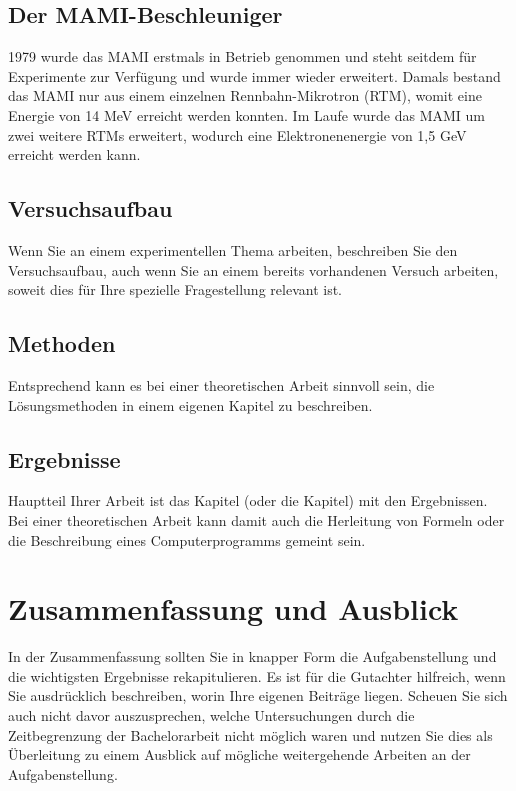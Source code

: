 \documentclass[a4paper,11pt,oneside,final,german,openbib,pdftex]{scrbook}
\begin{document}
\section{Der MAMI-Beschleuniger}
1979 wurde das MAMI erstmals in Betrieb genommen und steht seitdem für Experimente zur Verfügung und wurde immer wieder erweitert. Damals bestand das MAMI nur aus einem einzelnen Rennbahn-Mikrotron (RTM), womit eine Energie von 14 MeV erreicht werden konnten. Im Laufe wurde das MAMI um zwei weitere RTMs erweitert, wodurch eine Elektronenenergie von 1,5 GeV erreicht werden kann. \newline


\section{Versuchsaufbau}

Wenn Sie an einem experimentellen Thema arbeiten, beschreiben Sie 
den Versuchsaufbau, auch wenn Sie an einem bereits vorhandenen 
Versuch arbeiten, soweit dies f\"ur Ihre spezielle Fragestellung 
relevant ist. 

\section{Methoden}

Entsprechend kann es bei einer theoretischen Arbeit sinnvoll sein,
die L\"osungsmethoden in einem eigenen Kapitel zu beschreiben.

\section{Ergebnisse}

Hauptteil Ihrer Arbeit ist das Kapitel (oder die Kapitel) mit den 
Ergebnissen. Bei einer theoretischen Arbeit kann damit auch 
die Herleitung von Formeln oder die Beschreibung eines Computerprogramms 
gemeint sein.

\chapter{Zusammenfassung und Ausblick}

In der Zusammenfassung sollten Sie in knapper Form die Aufgabenstellung 
und die wichtigsten Ergebnisse rekapitulieren. Es ist f\"ur die 
Gutachter hilfreich, wenn Sie ausdr\"ucklich beschreiben, worin 
Ihre eigenen Beitr\"age liegen. Scheuen Sie sich auch nicht davor 
auszusprechen, welche Untersuchungen durch die Zeitbegrenzung der 
Bachelorarbeit nicht m\"oglich waren und nutzen Sie dies als 
\"Uberleitung zu einem Ausblick auf m\"ogliche weitergehende 
Arbeiten an der Aufgabenstellung.
\end{document}
